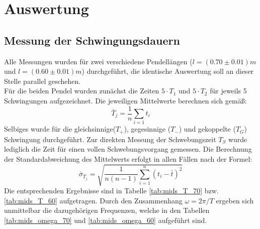 \section{Auswertung}

\subsection{Messung der Schwingungsdauern}
Alle Messungen wurden für zwei verschiedene Pendellängen ($l = (0.70 \pm 0.01)m$ und $l = (0.60 \pm 0.01)m$) durchgeführt, die identische Auswertung soll an dieser Stelle
parallel geschehen. \\
Für die beiden Pendel wurden zunächst die Zeiten $5 \cdot T_1$ und $5 \cdot T_2$ für jeweils 5 Schwingungen aufgezeichnet. Die jeweiligen Mittelwerte
berechnen sich gemäß:
\begin{equation}
\bar{T}_{j}=\frac{1}{n}\sum_{i=1}t_i
\end{equation}
Selbiges wurde für die gleichsinnige($T_{+}$), gegesinnige ($T_{-}$) und gekoppelte ($T_{G}$) Schwingung durchgeführt. Zur direkten Messung der Schwebungszeit $T_{S}$ wurde lediglich
die Zeit für einen vollen Schwebungsvorgang gemessen. Die Berechnung der Standardabweichung des Mittelwerts erfolgt in allen Fällen nach der Formel:
\begin{equation}
\bar{\sigma}_{\bar{T_j}}=\sqrt{\frac{1}{n(n-1)}\sum_{i=1}^{n}(t_i-\bar{t})^2}
\end{equation}
Die entsprechenden Ergebnisse sind in Tabelle \ref{tab:mids_T_70} bzw. \ref{tab:mids_T_60}  aufgetragen. Durch den Zusammenhang $\omega = 2\pi / T$ ergeben
sich unmittelbar die dazugehörigen Frequenzen, welche in den Tabellen \ref{tab:mids_omega_70} und \ref{tab:mids_omega_60} aufgeführt sind.\\

\begin{minipage}{\textwidth}

 \hfill

\end{minipage}

\begin{minipage}{\textwidth}

 \hfill

\end{minipage}


